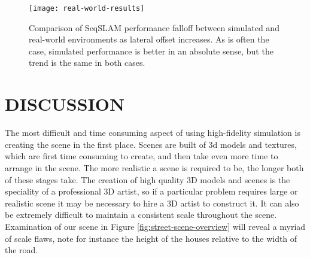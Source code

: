 \documentclass[letterpaper, 10 pt, conference]{ieeeconf}  %
\begin{document}
\begin{figure}[t]
    \texttt{[image: real-world-results]}
    \caption{Comparison of SeqSLAM performance falloff between simulated and real-world environments as lateral offset increases. As is often the case, simulated performance is better in an absolute sense, but the trend is the same in both cases.}
    \label{fig:real-world-results}
\end{figure}




\section{DISCUSSION}

The most difficult and time consuming aspect of using high-fidelity simulation is creating the scene in the first place. Scenes are built of 3d models and textures, which are first time consuming to create, and then take even more time to arrange in the scene. The more realistic a scene is required to be, the longer both of these stages take. The creation of high quality 3D models and scenes is the speciality of a professional 3D artist, so if a particular problem requires large or realistic scene it may be necessary to hire a 3D artist to construct it. It can also be extremely difficult to maintain a consistent scale throughout the scene. Examination of our scene in Figure \ref{fig:street-scene-overview} will reveal a myriad of scale flaws, note for instance the height of the houses relative to the width of the road.
\end{document}

